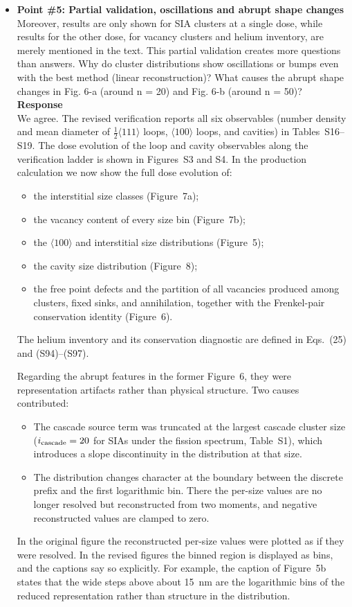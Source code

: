 \documentclass{article}
\newcommand{\hkl}[1]{\langle #1\rangle}
\newcommand{\half}{\tfrac{1}{2}}
\begin{document}
\begin{itemize}
\item \textbf{Point \#5: Partial validation, oscillations and abrupt shape changes}\\
Moreover, results are only shown for SIA clusters at a single dose, while results for the other dose, for vacancy clusters and helium inventory, are merely mentioned in the text. This partial validation creates more questions than answers. Why do cluster distributions show oscillations or bumps even with the best method (linear reconstruction)? What causes the abrupt shape changes in Fig. 6-a (around n = 20) and Fig. 6-b (around n = 50)?\\

\textbf{Response}\\
We agree. The revised verification reports all six observables (number density and mean diameter of $\half\hkl{111}$ loops, $\hkl{100}$ loops, and cavities) in Tables~S16--S19. The dose evolution of the loop and cavity observables along the verification ladder is shown in Figures~S3 and S4. In the production calculation we now show the full dose evolution of:
\begin{itemize}
    \item the interstitial size classes (Figure~7a);
    \item the vacancy content of every size bin (Figure~7b);
    \item the $\hkl{100}$ and interstitial size distributions (Figure~5);
    \item the cavity size distribution (Figure~8);
    \item the free point defects and the partition of all vacancies produced among clusters, fixed sinks, and annihilation, together with the Frenkel-pair conservation identity (Figure~6).
\end{itemize}
The helium inventory and its conservation diagnostic are defined in Eqs.~(25) and (S94)--(S97).

Regarding the abrupt features in the former Figure~6, they were representation artifacts rather than physical structure. Two causes contributed:
\begin{itemize}
    \item The cascade source term was truncated at the largest cascade cluster size ($i_{\rm cascade}=20$ for SIAs under the fission spectrum, Table~S1), which introduces a slope discontinuity in the distribution at that size.
    \item The distribution changes character at the boundary between the discrete prefix and the first logarithmic bin. There the per-size values are no longer resolved but reconstructed from two moments, and negative reconstructed values are clamped to zero.
\end{itemize}
In the original figure the reconstructed per-size values were plotted as if they were resolved. In the revised figures the binned region is displayed as bins, and the captions say so explicitly. For example, the caption of Figure~5b states that the wide steps above about 15~nm are the logarithmic bins of the reduced representation rather than structure in the distribution.


\end{itemize}
\end{document}
